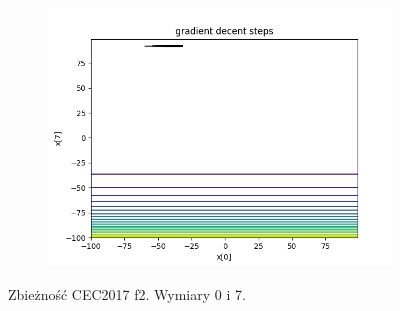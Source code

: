 \begin{figure}[h!]
\begin{subfigure}[b]{0.45\linewidth}
			\includegraphics[width=\linewidth]{photos/f2_3_1.png}
		\end{subfigure}
		\caption{Zbieżność CEC2017 f2. Wymiary 0 i 7.}
	\end{figure}
	\newpage
